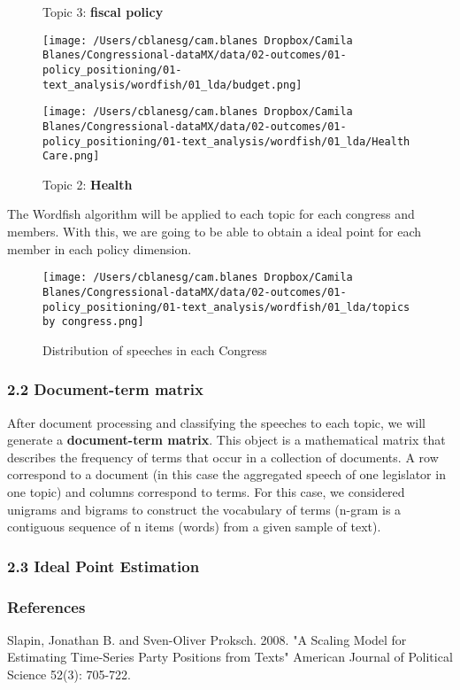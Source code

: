 \documentclass{article}
\begin{document}
\begin{figure}[!h]
	\centering
	\begin{minipage}{.5\textwidth}
		\centering
		\caption*{Topic 3: \textbf{fiscal policy}}
		\texttt{[image: /Users/cblanesg/cam.blanes Dropbox/Camila Blanes/Congressional-dataMX/data/02-outcomes/01-policy\_positioning/01-text\_analysis/wordfish/01\_lda/budget.png]}
		\label{fig:test1}
	\end{minipage}%
	\begin{minipage}{.5\textwidth}
		\centering
		\caption*{Topic 2: \textbf{Health}}
		\texttt{[image: /Users/cblanesg/cam.blanes Dropbox/Camila Blanes/Congressional-dataMX/data/02-outcomes/01-policy\_positioning/01-text\_analysis/wordfish/01\_lda/Health Care.png]}
		\label{fig:test2}
	\end{minipage}
\end{figure}

\newpage
The Wordfish algorithm will be applied to each topic for each congress and members. With this, we are going to be able to obtain a ideal point for each member in each policy dimension.

\begin{figure}[!h]
	\centering
	\begin{minipage}{1\textwidth}
		\centering
		\caption*{Distribution of speeches in each Congress}
		\texttt{[image: /Users/cblanesg/cam.blanes Dropbox/Camila Blanes/Congressional-dataMX/data/02-outcomes/01-policy\_positioning/01-text\_analysis/wordfish/01\_lda/topics by congress.png]}
		\label{fig:test1}
	\end{minipage}%
\end{figure}


 \subsubsection*{2.2 Document-term matrix}
 
 After document processing and classifying the speeches to each topic, we will generate a \textbf{document-term matrix}. This object is a mathematical matrix that describes the frequency of terms that occur in a collection of documents. A row correspond to a document (in this case the aggregated speech of one legislator in one topic) and columns correspond to terms. For this case, we considered unigrams and bigrams to construct the vocabulary of terms (n-gram is a contiguous sequence of n items (words) from a given sample of text). 
 
  \subsubsection*{2.3 Ideal Point Estimation}
  
 

\subsubsection*{References}
Slapin, Jonathan B. and Sven-Oliver Proksch. 2008. "A Scaling Model for Estimating Time-Series Party Positions from Texts" American Journal of Political Science 52(3): 705-722. 
\end{document}
